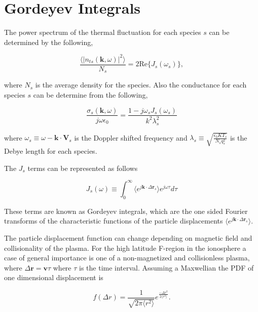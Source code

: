 \section{Gordeyev Integrals}
The power spectrum of the thermal fluctuation for each species $s$ can be determined by the following,

\begin{equation}
\label{eq:thermalfl}
\frac{\langle|n_{ts}(\mathbf{k},\omega)|^2\rangle}{N_s} = 2\text{Re}\{J_s(\omega_s)\},
\end{equation}

\noindent where $N_s$ is the average density for the species.  Also the conductance for each species $s$ can be determine from the following,

\begin{equation}
\label{eq:cond}
\frac{\sigma_{s}(\mathbf{k},\omega)}{j\omega\epsilon_0} = \frac{1-j\omega_s J_s(\omega_s)}{k^2\lambda_s^2}
\end{equation}

\noindent where $\omega_s \equiv \omega-\mathbf{k}\cdot\mathbf{V}_s $ is the Doppler shifted frequency and $\lambda_s \equiv \sqrt{\frac{\epsilon_0 KT_s}{N_s q_s^2}}$ is the Debye length for each species.

The $J_s$ terms can be represented as follows

\begin{equation}
\label{eq:gord}
J_s(\omega)\equiv \int_0^\infty \langle e^{j\mathbf{k}\cdot\Delta \mathbf{r}_s}\rangle e^{j\omega\tau}d\tau
\end{equation}

\noindent These terms are known as Gordeyev integrals, which are the one sided Fourier transforms of the characteristic functions of the particle displacements $\langle e^{j\mathbf{k}\cdot\Delta\mathbf{r}_s}\rangle$.  

The particle displacement function can change depending on magnetic field and collisionality of the plasma. For the high latitude F-region in the ionosphere a case of general importance is one of a non-magnetized and collisionless plasma, where $\Delta\mathbf{r} = \mathbf{v}\tau$ where $\tau$ is the time interval. Assuming a Maxwellian the PDF of one dimensional displacement is

\begin{equation}
\label{eq:pdfr}
f(\Delta r) = \frac{1}{\sqrt{2\pi \langle r^2 \rangle}}e^{\frac{-\Delta r^2}{2\langle r^2\rangle}}.
\end{equation}
 
